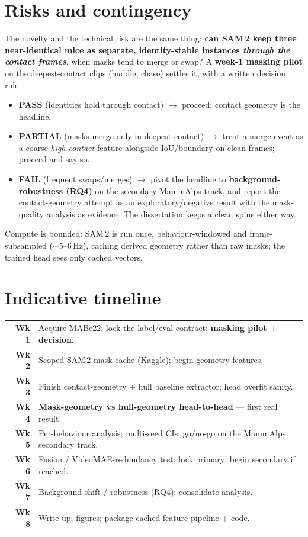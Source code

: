 \documentclass[11pt]{article}
\begin{document}
\section{Risks and contingency}
The novelty and the technical risk are the same thing: \textbf{can SAM\,2 keep three
near-identical mice as separate, identity-stable instances \emph{through the contact frames}}, when
masks tend to merge or swap? A \textbf{week-1 masking pilot} on the deepest-contact clips
(huddle, chase) settles it, with a written decision rule:
\begin{itemize}
  \item \textbf{PASS} (identities hold through contact) $\rightarrow$ proceed; contact geometry is
    the headline.
  \item \textbf{PARTIAL} (masks merge only in deepest contact) $\rightarrow$ treat a merge event as
    a coarse \emph{high-contact} feature alongside IoU/boundary on clean frames; proceed and say so.
  \item \textbf{FAIL} (frequent swaps/merges) $\rightarrow$ pivot the headline to
    \textbf{background-robustness (RQ4)} on the secondary MammAlps track, and report the
    contact-geometry attempt as an exploratory/negative result with the mask-quality analysis as
    evidence. The dissertation keeps a clean spine either way.
\end{itemize}
Compute is bounded: SAM\,2 is run once, behaviour-windowed and frame-subsampled ($\sim$5–6\,Hz),
caching derived geometry rather than raw masks; the trained head sees only cached vectors.

\section*{Indicative timeline}
\noindent
\begin{tabular}{@{}rl@{}}
\textbf{Wk 1} & Acquire MABe22; lock the label/eval contract; \textbf{masking pilot + decision}.\\
\textbf{Wk 2} & Scoped SAM\,2 mask cache (Kaggle); begin geometry features.\\
\textbf{Wk 3} & Finish contact-geometry + hull baseline extractor; head overfit sanity.\\
\textbf{Wk 4} & \textbf{Mask-geometry vs hull-geometry head-to-head} — first real result.\\
\textbf{Wk 5} & Per-behaviour analysis; multi-seed CIs; go/no-go on the MammAlps secondary track.\\
\textbf{Wk 6} & Fusion / VideoMAE-redundancy test; lock primary; begin secondary if reached.\\
\textbf{Wk 7} & Background-shift / robustness (RQ4); consolidate analysis.\\
\textbf{Wk 8} & Write-up; figures; package cached-feature pipeline + code.\\
\end{tabular}
\end{document}

